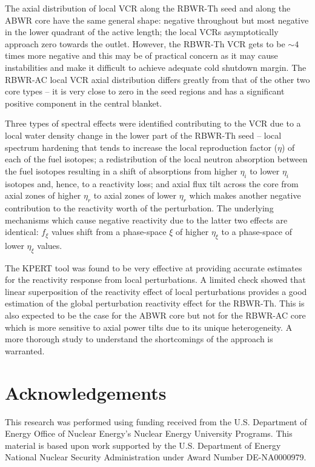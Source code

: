 \documentclass[11pt]{article}
\newcommand{\tild}[0]{\sim\!\!}
\begin{document}
The axial distribution of local VCR along the RBWR-Th seed and along the ABWR core have the same general shape: negative throughout but most negative in the lower quadrant of the active length; the local VCRs asymptotically approach zero towards the outlet.
However, the RBWR-Th VCR gets to be $\tild 4$ times more negative and this may be of practical concern as it may cause instabilities and make it difficult to achieve adequate cold shutdown margin.
The RBWR-AC local VCR axial distribution differs greatly from that of the other two core types -- it is very close to zero in the seed regions and has a significant positive component in the central blanket.

Three types of spectral effects were identified contributing to the VCR due to a local water density change in the lower part of the RBWR-Th seed -- local spectrum hardening that tends to increase the local reproduction factor ($\eta$) of each of the fuel isotopes; a redistribution of the local neutron absorption between the fuel isotopes resulting in a shift of absorptions from higher $\eta_i$ to lower $\eta_i$ isotopes and, hence, to a reactivity loss; and axial flux tilt across the core from axial zones of higher $\eta_r$ to axial zones of lower $\eta_r$ which makes another negative contribution to the reactivity worth of the perturbation.
The underlying mechanisms which cause negative reactivity due to the latter two effects are identical: $f_\xi$ values shift from a phase-space $\xi$ of higher $\eta_\xi$ to a phase-space of lower $\eta_\xi$ values.

The KPERT tool was found to be very effective at providing accurate estimates for the reactivity response from local perturbations.
A limited check showed that linear superposition of the reactivity effect of local perturbations provides a good estimation of the global perturbation reactivity effect for the RBWR-Th.
This is also expected to be the case for the ABWR core but not for the RBWR-AC core which is more sensitive to axial power tilts due to its unique heterogeneity.
A more thorough study to understand the shortcomings of the approach is warranted.

\section{Acknowledgements}

This research was performed using funding received from the U.S. Department of Energy Office of Nuclear Energy's Nuclear Energy University Programs.
This material is based upon work supported by the U.S. Department of Energy National Nuclear Security Administration under Award Number DE-NA0000979.
\end{document}
